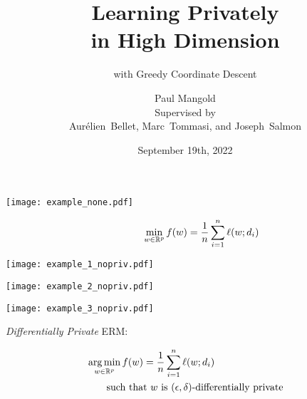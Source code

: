 \documentclass{beamer}
\author{
  Paul Mangold \\[1em]
 Supervised by \\ Aurélien~Bellet, Marc~Tommasi, and Joseph~Salmon
}
\institute{\textsc{PhD Forum -- ECML 2022}}
\date{September 19th, 2022}
\begin{document}

\title{\Huge Learning Privately \\ in High Dimension}
\subtitle{\LARGE with Greedy Coordinate Descent
\vspace{-1.17em}}
\begin{notitle}
  \begin{frame}
    \titlepage
  \end{frame}
  \addtocounter{framenumber}{-1}
\end{notitle}

\hspace{-3.3em}
\begin{frame}
  \vspace{-7.7em}
  \texttt{[image: example\_none.pdf]}

  \vspace{-18em}
  \begin{align*}
    \qquad \qquad ~ \min_{w\in\mathbb R^p} f(w)
    & = \frac 1n \sum_{i=1}^n \ell(w; d_i)
  \end{align*}
\end{frame}

\hspace{-3.3em}
\begin{frame}
  \vspace{-1.8em}
  \texttt{[image: example\_1\_nopriv.pdf]}
  \addtocounter{framenumber}{-1}
\end{frame}

\hspace{-3.3em}
\begin{frame}
  \vspace{-1.8em}
  \texttt{[image: example\_2\_nopriv.pdf]}
  \addtocounter{framenumber}{-1}
\end{frame}

\hspace{-3.3em}
\begin{frame}
  \vspace{-1.8em}
  \texttt{[image: example\_3\_nopriv.pdf]}
  \addtocounter{framenumber}{-1}
\end{frame}

\begin{frame}
  \vspace{2em}

  \textit{Differentially Private} ERM:

  \vspace{-1em}

  \begin{align*}
    & \operatorname*{arg\,min}_{w \in \mathbb R^p}  f(w) = \frac 1n \sum_{i=1}^n \ell(w; d_i) \\
    & \qquad \text{such that $w$ is $(\epsilon, \delta)$-differentially private}
  \end{align*}

\end{frame}
\end{document}

